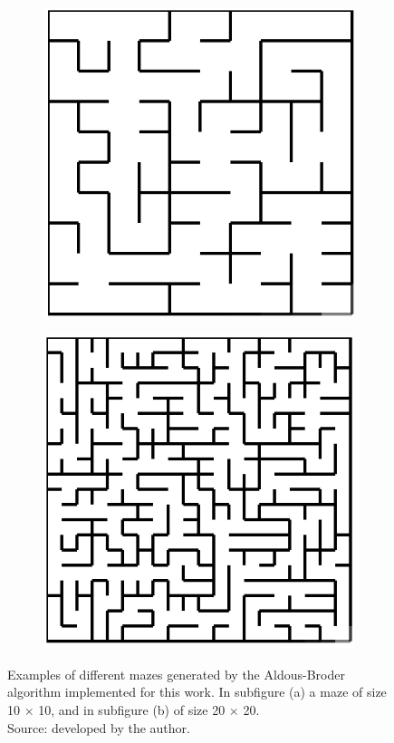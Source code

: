 \newline
\begin{figure}[!h]
	\centering
	\begin{subfigure}{.45\textwidth}
	  \centering
	  \includegraphics[width=.6\linewidth]{aldous1010}
	  \caption{}
	  \label{fig:sub1}
	\end{subfigure}
	\begin{subfigure}{.45\textwidth}
	  \centering
	  \includegraphics[width=.6\linewidth]{aldous2020}
	  \caption{}
	  \label{fig:sub2}
	\end{subfigure}
	\caption{Examples of different mazes generated by the Aldous-Broder algorithm implemented for this work.
	In subfigure (a) a maze of size 10 $\times$ 10, and in subfigure (b) of size 20 $\times$ 20.\\Source: developed by the author.}
	\label{fig:test}
	\end{figure}
\newpage

